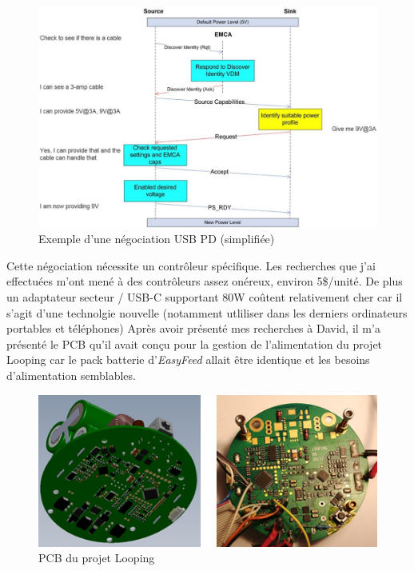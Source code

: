 \documentclass[a4paper, 11pt]{report}
\begin{document}
\begin{figure}[!h]
\begin{center}
\includegraphics[scale=0.35]{figures/screenshots/usb_pd_nego.png}
\end{center}
\caption{Exemple d’une négociation USB PD (simplifiée)}
\label{fig:usb_pd_negociation}
\end{figure}

Cette négociation nécessite un contrôleur spécifique. Les recherches que j’ai effectuées m’ont mené à des contrôleurs assez onéreux, environ 5\$/unité. De plus un adaptateur secteur / USB-C supportant 80W coûtent relativement cher car il s'agit d'une technolgie nouvelle (notamment utliliser dans les derniers ordinateurs portables et téléphones)
Après avoir présenté mes recherches à David, il m'a présenté le PCB qu’il avait conçu pour la gestion de l’alimentation du projet Looping car le pack batterie d'\emph{EasyFeed} allait être identique et les besoins d'alimentation semblables.

\begin{figure}[!h]
\begin{center}
\includegraphics[scale=1]{figures/photos/looping_pcb.jpg}
\end{center}
\caption{PCB du projet Looping}
\label{fig:looping_pcb}
\end{figure}
\end{document}

